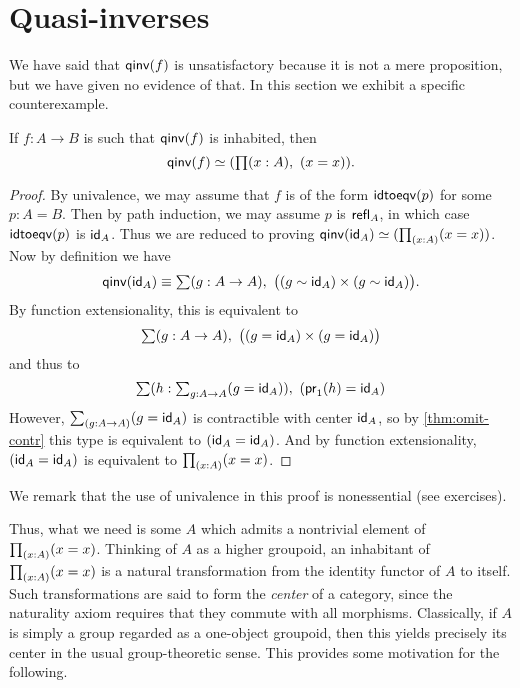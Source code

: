 \section{Quasi-inverses}
\label{sec:quasi-inverses}

We have said that $\qinv(f)$ is unsatisfactory because it is not a mere proposition, but we have given no evidence of that.
In this section we exhibit a specific counterexample.

\begin{lem}\label{lem:qinv-autohtpy}
  If $f:A\to B$ is such that $\qinv (f)$ is inhabited, then
  \[\eqv{\qinv(f)}{(\prd{x:A}(x=x))}.\]
\end{lem}
\begin{proof}
  By univalence, we may assume that $f$ is of the form $\idtoeqv(p)$ for some $p:A=B$.
  Then by path induction, we may assume $p$ is $\refl{A}$, in which case $\idtoeqv(p)$ is $\idfunc[A]$.
  Thus we are reduced to proving $\eqv{\qinv(\idfunc[A])}{(\prd{x:A}(x=x))}$.
  Now by definition we have
  \[ \qinv(\idfunc[A]) \jdeq
  \sm{g:A\to A} \big((g \htpy \idfunc[A]) \times (g \htpy \idfunc[A])\big).
  \]
  By function extensionality, this is equivalent to
  \[ \sm{g:A\to A} \big((g = \idfunc[A]) \times (g = \idfunc[A])\big)
  \]
  and thus to
  \[ \sm{h:\textstyle\sum_{g:A\to A} (g = \idfunc[A])} (\proj1(h) = \idfunc[A])
  \]
  However, $\sm{g:A\to A} (g = \idfunc[A])$ is contractible with center $\idfunc[A]$, so by \autoref{thm:omit-contr} this type is equivalent to $(\idfunc[A] = \idfunc[A])$.
  And by function extensionality, $(\idfunc[A] = \idfunc[A])$ is equivalent to $\prd{x:A}(x=x)$.
\end{proof}
We remark that the use of univalence in this proof is nonessential (see exercises).

Thus, what we need is some $A$ which admits a nontrivial element of $\prd{x:A}(x=x)$.
Thinking of $A$ as a higher groupoid, an inhabitant of $\prd{x:A}(x=x)$ is a natural transformation from the identity functor of $A$ to itself.
Such transformations are said to form the \emph{center} of a category, since the naturality axiom requires that they commute with all morphisms.
Classically, if $A$ is simply a group regarded as a one-object groupoid, then this yields precisely its center in the usual group-theoretic sense.
This provides some motivation for the following.

